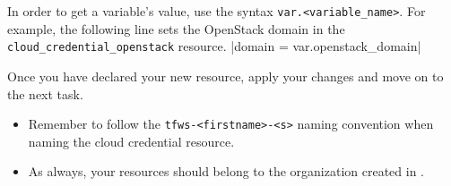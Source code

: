 \begin{tip}
In order to get a variable's value, use the syntax \texttt{var.<variable\_name>}.
For example, the following line sets the OpenStack domain in the \texttt{cloud\_credential\_openstack} resource.
|domain = var.openstack_domain|
\end{tip}

Once you have declared your new resource, apply your changes and move on to the next task.

\begin{warn}
  \begin{itemize}
    \item Remember to follow the \texttt{tfws-<firstname>-<s>} naming convention when naming the cloud credential resource.
    \item As always, your resources should belong to the organization created in .
  \end{itemize}
\end{warn}

